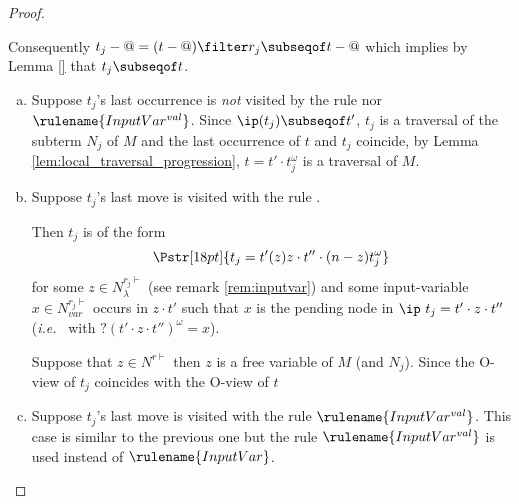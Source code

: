 \begin{proof}
\begin{enumerate}[$\bullet$]
\begin{enumerate}
\begin{enumerate}[-]
        Consequently $t_j-@ = (t-@) \filter r_j \subseqof t-@$ which implies by Lemma \ref{} that $t_j \subseqof t$.

    \begin{enumerate}[(a)]
    \item  Suppose $t_j$'s last occurrence is \emph{not} visited by the rule  nor $\rulename{InputVar^{val}}$. Since $\ip( t_j) \subseqof t'$, $t_j$ is a traversal of the subterm $N_j$ of $M$ and the last occurrence
        of $t$ and $t_j$ coincide, by Lemma
        \ref{lem:local_traversal_progression}, $t =
        t' \cdot t_j^\omega$ is a traversal of $M$.

    \item Suppose $t_j$'s last move is visited with the rule .

    Then $t_j$ is of the form
    $$\Pstr[18pt]{ t_j = t' (z)z \cdot t'' \cdot (n-z){t_j^\omega}}$$
for some $z \in N_\lambda^{r_j\vdash}$ (see remark
\ref{rem:inputvar}) and some input-variable $x \in
N^{r_j\vdash}_{var}$ occurs in $z\cdot t'$ such that
$x$ is
 the pending node in $\ip\ t_j = t' \cdot z \cdot
 t''$ ({\it i.e.}~ with $?(t' \cdot z \cdot
 t'')^\omega = x$).

Suppose that $z\in N^{r\vdash}$ then $z$ is a free variable of $M$ (and $N_j$).
Since the O-view of $t_j$ coincides with the O-view of $t$

    \item Suppose $t_j$'s last move is visited with the rule $\rulename{InputVar^{val}}$.
    This case is similar to the previous one but the rule $\rulename{InputVar^{val}}$ is used instead
    of $\rulename{InputVar}$.
    \end{enumerate}



\end{enumerate}
\end{enumerate}
\end{enumerate}
\end{proof}
